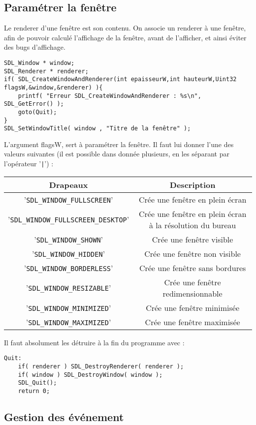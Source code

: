 \documentclass[ 10pt , a4paper ]{Document}
\begin{document}
\begin{Document}
	\subsection{Paramétrer la fenêtre}
	Le renderer d'une fenêtre est son contenu. On associe un renderer à une fenêtre, afin de pouvoir calculé l'affichage de la fenêtre, avant de l'afficher, et ainsi éviter des bugs d'affichage.
\begin{lstlisting}[name="Créer une fenêtre et son renderer"]
SDL_Window * window;
SDL_Renderer * renderer;
if( SDL_CreateWindowAndRenderer(int epaisseurW,int hauteurW,Uint32 flagsW,&window,&renderer) ){
	printf( "Erreur SDL_CreateWindowAndRenderer : %s\n", SDL_GetError() );
	goto(Quit);
}
SDL_SetWindowTitle( window , "Titre de la fenêtre" );
\end{lstlisting}
	L'argument flagsW, sert à paramétrer la fenêtre. Il faut lui donner l'une des valeurs suivantes (il est possible dans donnée plusieurs, en les séparant par l'opérateur '\lstinline!|!') :\\
	\begin{tabular}{|c|c|}\hline
		Drapeaux & Description\\
		\hline\hline
		'\lstinline!SDL_WINDOW_FULLSCREEN!' & Crée une fenêtre en plein écran\\
		\hline
		'\lstinline!SDL_WINDOW_FULLSCREEN_DESKTOP!' & Crée une fenêtre en plein écran à la résolution du bureau\\
		\hline
		'\lstinline!SDL_WINDOW_SHOWN!' & Crée une fenêtre visible\\
		\hline
		'\lstinline!SDL_WINDOW_HIDDEN!' & Crée une fenêtre non visible\\
		\hline
		'\lstinline!SDL_WINDOW_BORDERLESS!' & Crée une fenêtre sans bordures\\
		\hline
		'\lstinline!SDL_WINDOW_RESIZABLE!' & Crée une fenêtre redimensionnable\\
		\hline
		'\lstinline!SDL_WINDOW_MINIMIZED!' & Crée une fenêtre minimisée\\
		\hline
		'\lstinline!SDL_WINDOW_MAXIMIZED!' & Crée une fenêtre maximisée\\
		\hline
	\end{tabular}
	Il faut absolument les détruire à la fin du programme avec :
\begin{lstlisting}[name="Détruire une fenêtre et son renderer"]
Quit:
	if( renderer ) SDL_DestroyRenderer( renderer );
	if( window ) SDL_DestroyWindow( window );
	SDL_Quit();
	return 0;
\end{lstlisting}
	\subsection{Gestion des événement}

\end{Document}
\end{document}
